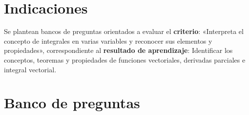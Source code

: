 \documentclass[a4,11pt]{aleph-notas}
\begin{document}
\encabezado

\vspace*{-8mm}
\tableofcontents

\section{Indicaciones}

Se plantean bancos de preguntas orientados a evaluar el \textbf{criterio}: «Interpreta el concepto de integrales en varias variables y reconocer sus elementos y propiedades», correspondiente al \textbf{resultado de aprendizaje}: Identificar los conceptos, teoremas y propiedades de funciones vectoriales, derivadas parciales e integral vectorial.

\section{Banco de preguntas}
\end{document}
